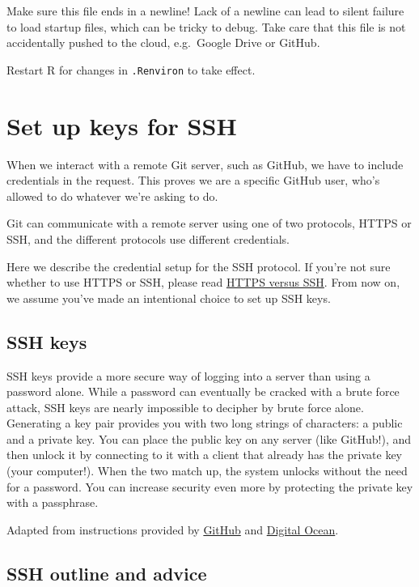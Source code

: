 \documentclass[
]{book}
\begin{document}
Make sure this file ends in a newline!
Lack of a newline can lead to silent failure to load startup files, which can be tricky to debug.
Take care that this file is not accidentally pushed to the cloud, e.g.~Google Drive or GitHub.

Restart R for changes in \texttt{.Renviron} to take effect.

\chapter{Set up keys for SSH}\label{ssh-keys}

When we interact with a remote Git server, such as GitHub, we have to include credentials in the request.
This proves we are a specific GitHub user, who's allowed to do whatever we're asking to do.

Git can communicate with a remote server using one of two protocols, HTTPS or SSH, and the different protocols use different credentials.

Here we describe the credential setup for the SSH protocol.
If you're not sure whether to use HTTPS or SSH, please read \hyperref[https-vs-ssh]{HTTPS versus SSH}.
From now on, we assume you've made an intentional choice to set up SSH keys.

\section{SSH keys}\label{ssh-keys-1}

SSH keys provide a more secure way of logging into a server than using a password alone. While a password can eventually be cracked with a brute force attack, SSH keys are nearly impossible to decipher by brute force alone. Generating a key pair provides you with two long strings of characters: a public and a private key. You can place the public key on any server (like GitHub!), and then unlock it by connecting to it with a client that already has the private key (your computer!). When the two match up, the system unlocks without the need for a password. You can increase security even more by protecting the private key with a passphrase.

Adapted from instructions provided by \href{https://help.github.com/categories/ssh/}{GitHub} and \href{https://www.digitalocean.com/community/tutorials/how-to-set-up-ssh-keys--2}{Digital Ocean}.

\section{SSH outline and advice}\label{ssh-outline-and-advice}
\end{document}
